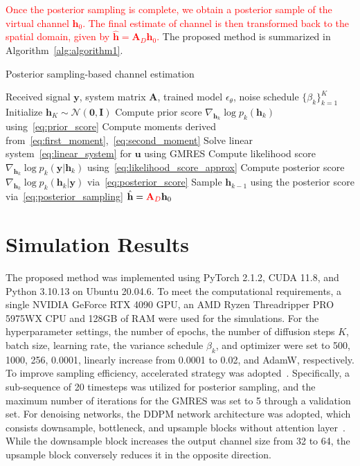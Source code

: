 \documentclass[lettersize,journal]{IEEEtran}
\newcommand{\tred}{\textcolor{red}}
\begin{document}
\tred{Once the posterior sampling is complete, we obtain a posterior sample of the virtual channel $\mathbf{h}_{0}$. The final estimate of channel is then transformed back to the spatial domain, given by $\hat{\mathbf{h}} = \mathbf{A}_{D}\mathbf{h}_{0}$.} The proposed method is summarized in Algorithm~\ref{alg:algorithm1}.

\begin{algorithm}[!t]
\caption{Posterior sampling-based channel estimation}
\label{alg:algorithm1}
\begin{algorithmic}[1]
\REQUIRE Received signal $\mathbf{y}$, system matrix $\mathbf{A}$, trained model $\epsilon_{\theta}$, noise schedule $\{\beta_{k}\}_{k=1}^{K}$
\STATE Initialize $\mathbf{h}_K \sim \mathcal{N}(\mathbf{0}, \mathbf{I})$
	\STATE Compute prior score $\nabla_{\mathbf{h}_{k}}\log p_{k}(\mathbf{h}_{k})$ using~\eqref{eq:prior_score}
	\STATE Compute moments derived from~\eqref{eq:first_moment},~\eqref{eq:second_moment}
	\STATE Solve linear system~\eqref{eq:linear_system} for $\mathbf{u}$ using GMRES
	\STATE Compute likelihood score $\nabla_{\mathbf{h}_{k}}\log p_{k}(\mathbf{y}|\mathbf{h}_{k})$ using~\eqref{eq:likelihood_score_approx}
	\STATE Compute posterior score $\nabla_{\mathbf{h}_{k}}\log p_{k}(\mathbf{h}_{k}|\mathbf{y})$ via~\eqref{eq:posterior_score}
	\STATE Sample $\mathbf{h}_{k-1}$ using the posterior score via~\eqref{eq:posterior_sampling}
\ENDFOR
\RETURN $\hat{\mathbf{h}} = \tred{\mathbf{A}_{D}}\mathbf{h}_{0}$
\end{algorithmic}
\end{algorithm}

\section{Simulation Results}

The proposed method was implemented using PyTorch 2.1.2, CUDA 11.8, and Python 3.10.13 on Ubuntu 20.04.6. To meet the computational requirements, a single NVIDIA GeForce RTX 4090 GPU, an AMD Ryzen Threadripper PRO 5975WX CPU and 128GB of RAM were used for the simulations. For the hyperparameter settings, the number of epochs, the number of diffusion steps $K$, batch size, learning rate, the variance schedule $\beta_{k}$, and optimizer were set to 500, 1000, 256, 0.0001, linearly increase from 0.0001 to 0.02, and AdamW, respectively.
To improve sampling efficiency, accelerated strategy was adopted~\cite{songDenoisingDiffusionImplicit2020}. Specifically, a sub-sequence of 20 timesteps was utilized for posterior sampling, and the maximum number of iterations for the GMRES was set to 5 through a validation set. For denoising networks, the DDPM network architecture was adopted, which consists downsample, bottleneck, and upsample blocks without attention layer~\cite{hoDenoisingDiffusionProbabilistic2020}. While the downsample block increases the output channel size from 32 to 64, the upsample block conversely reduces it in the opposite direction.
\end{document}

